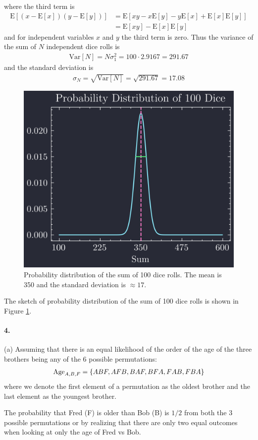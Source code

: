 \documentclass[../main.tex]{subfiles}
\newcommand{\E}{\mathrm{E}}
\newcommand{\Var}{\mathrm{Var}}
\begin{document}
where the third term is
\begin{align*}
    \E[(x - \E[x])(y - \E[y])] &= \E[xy - x\E[y] - y\E[x] + \E[x]\E[y]] \\
    &= \E[xy] - \E[x]\E[y]
\end{align*}
and for independent variables $x$ and $y$ the third term is zero. Thus the variance of the sum of
$N$ independent dice rolls is
\begin{align*}
    \Var[N] = N\sigma_1^2 = 100 \cdot 2.9167 = 291.67
\end{align*}
and the standard deviation is
\begin{align*}
    \sigma_N = \sqrt{\Var[N]} = \sqrt{291.67} = \boxed{17.08}
\end{align*}

\begin{figure}[ht]
    \centering
    \includegraphics[width=0.5\linewidth]{hw1_3b.png}
    \captionsetup{width=0.8\linewidth}
    \caption{Probability distribution of the sum of 100 dice rolls. The mean is 350 and the
    standard deviation is $\approx 17$.}
    \label{fig:hw1_3b}
\end{figure}
The sketch of probability distribution of the sum of 100 dice rolls is shown in
Figure \ref{fig:hw1_3b}. 

\paragraph{4.} (a) Assuming that there is an equal likelihood of the order of the age of the three
brothers being any of the 6 possible permutations:
\begin{align*}
    \textrm{Age}_{A,B,F} = \qt{ABF, AFB, BAF, BFA, FAB, FBA}
\end{align*}
where we denote the first element of a permutation as the oldest brother and the last element as
the youngest brother.

The probability that Fred (F) is older than Bob 
(B) is $\boxed{1/2}$ from both the 3 possible permutations or by realizing that there are only two
equal outcomes when looking at only the age of Fred vs Bob.
\end{document}
